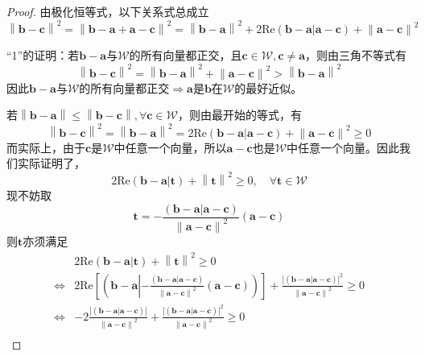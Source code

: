 \documentclass[main.tex]{subfiles}
\begin{document}
\begin{proof}
    由极化恒等式，以下关系式总成立
    \[\left\|\mathbf{b}-\mathbf{c}\right\|^2=\left\|\mathbf{b}-\mathbf{a}+\mathbf{a}-\mathbf{c}\right\|^2=\left\|\mathbf{b}-\mathbf{a}\right\|^2+2\mathrm{Re}\left(\mathbf{b}-\mathbf{a}|\mathbf{a}-\mathbf{c}\right)+\left\|\mathbf{a}-\mathbf{c}\right\|^2\]

    “1”的证明：若$\mathbf{b}-\mathbf{a}$与$\mathcal{W}$的所有向量都正交，且$\mathbf{c}\in\mathcal{W},\mathbf{c}\neq\mathbf{a}$，则由三角不等式有
    \[\left\|\mathbf{b}-\mathbf{c}\right\|^2=\left\|\mathbf{b}-\mathbf{a}\right\|^2+\left\|\mathbf{a}-\mathbf{c}\right\|^2 > \left\|\mathbf{b}-\mathbf{a}\right\|^2\]
    因此$\mathbf{b}-\mathbf{a}$与$\mathcal{W}$的所有向量都正交$\Rightarrow\mathbf{a}$是$\mathbf{b}$在$\mathcal{W}$的最好近似。

    若$\left\|\mathbf{b}-\mathbf{a}\right\|\leq\left\|\mathbf{b}-\mathbf{c}\right\|,\forall\mathbf{c}\in\mathcal{W}$，则由最开始的等式，有
    \[\left\|\mathbf{b}-\mathbf{c}\right\|^2=\left\|\mathbf{b}-\mathbf{a}\right\|^2=2\mathrm{Re}\left(\mathbf{b}-\mathbf{a}|\mathbf{a}-\mathbf{c}\right)+\left\|\mathbf{a}-\mathbf{c}\right\|^2\geq0\]
    而实际上，由于$\mathbf{c}$是$\mathcal{W}$中任意一个向量，所以$\mathbf{a}-\mathbf{c}$也是$\mathcal{W}$中任意一个向量。因此我们实际证明了，
    \[2\mathrm{Re}\left(\mathbf{b}-\mathbf{a}|\mathbf{t}\right)+\left\|\mathbf{t}\right\|^2\geq0,\quad\forall\mathbf{t}\in\mathcal{W}\]
    现不妨取
    \[\mathbf{t}=-\frac{\left(\mathbf{b}-\mathbf{a}|\mathbf{a}-\mathbf{c}\right)}{\left\|\mathbf{a}-\mathbf{c}\right\|^2}\left(\mathbf{a}-\mathbf{c}\right)\]
    则$\mathbf{t}$亦须满足
    \begin{align*}
                        & 2\mathrm{Re}\left(\mathbf{b}-\mathbf{a}|\mathbf{t}\right)+\left\|\mathbf{t}\right\|^2\geq 0                                                                                                                                                                                                                                                                  \\
        \Leftrightarrow & 2\mathrm{Re}\left[\left(\left.\mathbf{b}-\mathbf{a}\right.\left|-\frac{\left(\mathbf{b}-\mathbf{a}|\mathbf{a}-\mathbf{c}\right)}{\left\|\mathbf{a}-\mathbf{c}\right\|^2}\left(\mathbf{a}-\mathbf{c}\right)\right.\right)\right]+\frac{\left|\left(\mathbf{b}-\mathbf{a}|\mathbf{a}-\mathbf{c}\right)\right|^2}{\left\|\mathbf{a}-\mathbf{c}\right\|^2}\geq 0 \\
        \Leftrightarrow & -2\frac{\left|\left(\mathbf{b}-\mathbf{a}|\mathbf{a}-\mathbf{c}\right)\right|}{\left\|\mathbf{a}-\mathbf{c}\right\|^2}+\frac{\left|\left(\mathbf{b}-\mathbf{a}|\mathbf{a}-\mathbf{c}\right)\right|^2}{\left\|\mathbf{a}-\mathbf{c}\right\|^2}\geq 0                                                                                                          \\

\end{align*}
\end{proof}
\end{document}
